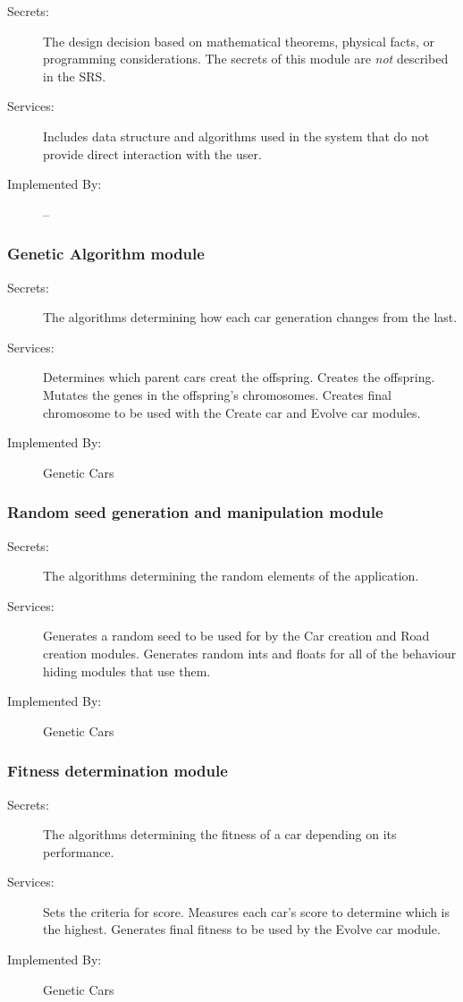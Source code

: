 \documentclass[12pt, titlepage]{article}
\begin{document}
\begin{description}
\item[Secrets:] The design decision based on mathematical theorems, physical
  facts, or programming considerations. The secrets of this module are
  \emph{not} described in the SRS.
\item[Services:] Includes data structure and algorithms used in the system that
  do not provide direct interaction with the user. 
\item[Implemented By:] --
\end{description}

\subsubsection{Genetic Algorithm module}

\begin{description}
\item[Secrets:] The algorithms determining how each car generation changes from the last.
\item[Services:] Determines which parent cars creat the offspring. Creates the offspring. Mutates the genes in the offspring's chromosomes. Creates final chromosome to be used with the Create car and Evolve car modules.
\item[Implemented By:] Genetic Cars
\end{description}

\subsubsection{Random seed generation and manipulation module}

\begin{description}
\item[Secrets:] The algorithms determining the random elements of the application.
\item[Services:] Generates a random seed to be used for by the Car creation and Road creation modules. Generates random ints and floats for all of the behaviour hiding modules that use them.
\item[Implemented By:] Genetic Cars
\end{description}

\subsubsection{Fitness determination module}

\begin{description}
\item[Secrets:] The algorithms determining the fitness of  a car depending on its performance.
\item[Services:] Sets the criteria for score. Measures each car's score to determine which is the highest. Generates final fitness to be used by the Evolve car module.
\item[Implemented By:] Genetic Cars
\end{description}
\end{document}
